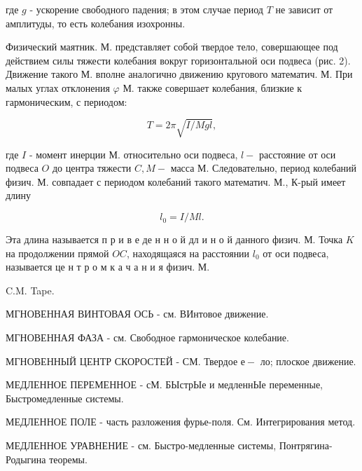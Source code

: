 \documentclass[10pt]{article}
\begin{document}
где $g$ - ускорение свободного падения; в этом случае период $T$ не зависит от амплитуды, то есть колебания изохронны.



Физический маятник. М. представляет собой твердое тело, совершающее под действием силы тяжести колебания вокруг горизонтальной оси подвеса (рис. 2). Движение такого М. вполне аналогично движению кругового математич. М. При малых углах отклонения $\varphi$ М. также совершает колебания, близкие к гармоническим, с периодом:



\[

T=2 \pi \sqrt{I / M g l},

\]



где $I$ - момент инерции М. относительно оси подвеса, $l-$ расстояние от оси подвеса $O$ до центра тяжести $C, M-$ масса М. Следовательно, период колебаний физич. М. совпадает с периодом колебаний такого математич. М., К-рый имеет длину



\[

l_{0}=I / M l .

\]



Эта длина называется п р и в е де н н о й дл и н о й данного физич. М. Точка $K$ на продолжении прямой $O C$, находящаяся на расстоянии $l_{0}$ от оси подвеса, называется це н т р о м к а ч а н и я физич. М.



C.M. Tape.



МГНОВЕННАЯ ВИНТОВАЯ ОСЬ - см. ВИнтовое движение.



МГНОВЕННАЯ ФАЗА - см. Свободное гармоническое колебание.



МГНОВЕННЫЙ ЦЕНТР СКОРОСТЕЙ - СМ. Твердое $е-$ ло; плоское движение.



МЕДЛЕННОЕ ПЕРЕМЕННОЕ - сМ. БЫстрЫе и медленнЫе переменные, Быстромедленные системы.



МЕДЛЕННОЕ ПОЛЕ - часть разложения фурье-поля. См. Интегрирования метод.



МЕДЛЕННОЕ УРАВНЕНИЕ - см. Быстро-медленные системы, Понтрягина-Родыгина теоремы.
\end{document}
